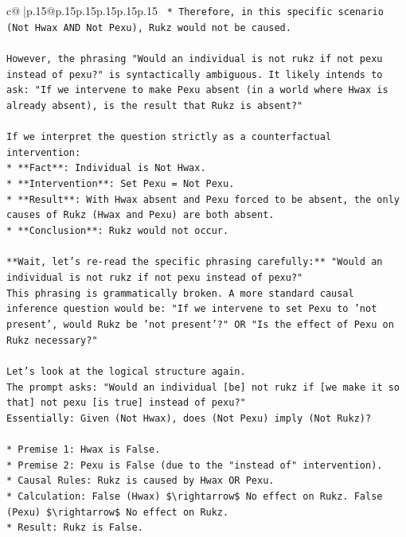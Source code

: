 \documentclass{article}
\begin{document}
{\begin{supertabular}{c@{$\;$}|p{.15\linewidth}@{}p{.15\linewidth}p{.15\linewidth}p{.15\linewidth}p{.15\linewidth}p{.15\linewidth}}
{{{\texttt{        *   Therefore, in this specific scenario (Not Hwax AND Not Pexu), Rukz would not be caused.} \\
\\ 
\texttt{However, the phrasing "Would an individual is not rukz if not pexu instead of pexu?" is syntactically ambiguous. It likely intends to ask: "If we intervene to make Pexu absent (in a world where Hwax is already absent), is the result that Rukz is absent?"} \\
\\ 
\texttt{If we interpret the question strictly as a counterfactual intervention:} \\
\texttt{*   **Fact**: Individual is Not Hwax.} \\
\texttt{*   **Intervention**: Set Pexu = Not Pexu.} \\
\texttt{*   **Result**: With Hwax absent and Pexu forced to be absent, the only causes of Rukz (Hwax and Pexu) are both absent.} \\
\texttt{*   **Conclusion**: Rukz would not occur.} \\
\\ 
\texttt{**Wait, let's re{-}read the specific phrasing carefully:** "Would an individual is not rukz if not pexu instead of pexu?"} \\
\texttt{This phrasing is grammatically broken. A more standard causal inference question would be: "If we intervene to set Pexu to 'not present', would Rukz be 'not present'?" OR "Is the effect of Pexu on Rukz necessary?"} \\
\\ 
\texttt{Let's look at the logical structure again.} \\
\texttt{The prompt asks: "Would an individual {[}be{]} not rukz if {[}we make it so that{]} not pexu {[}is true{]} instead of pexu?"} \\
\texttt{Essentially: Given (Not Hwax), does (Not Pexu) imply (Not Rukz)?} \\
\\ 
\texttt{*   Premise 1: Hwax is False.} \\
\texttt{*   Premise 2: Pexu is False (due to the "instead of" intervention).} \\
\texttt{*   Causal Rules: Rukz is caused by Hwax OR Pexu.} \\
\texttt{*   Calculation: False (Hwax) \$\textbackslash{}rightarrow\$ No effect on Rukz. False (Pexu) \$\textbackslash{}rightarrow\$ No effect on Rukz.} \\
\texttt{*   Result: Rukz is False.} \\
}}}
\end{supertabular}}
\end{document}

